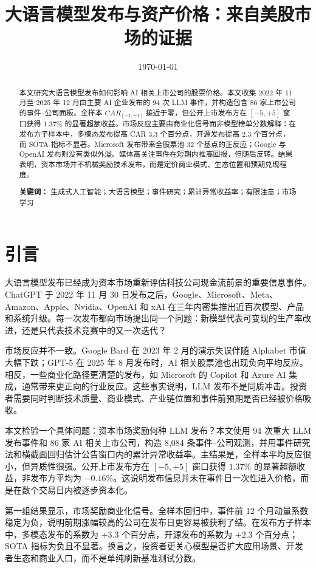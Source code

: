 \documentclass[11pt,fontset=fandol]{ctexart}
\title{\textbf{大语言模型发布与资产价格：来自美股市场的证据}}
\author{}
\date{\today}
\begin{document}
\maketitle

\begin{abstract}
\noindent 本文研究大语言模型发布如何影响 AI 相关上市公司的股票价格。本文收集 2022 年 11 月至 2025 年 12 月由主要 AI 企业发布的 94 次 LLM 事件，并构造包含 86 家上市公司的事件--公司面板。全样本 $CAR_{[-1,+1]}$ 接近于零，但公开上市发布方在 $[-5,+5]$ 窗口获得 $1.37\%$ 的显著超额收益。市场反应主要由商业化信号而非模型榜单分数解释：在发布方子样本中，多模态发布提高 CAR $3.3$ 个百分点，开源发布提高 $2.3$ 个百分点，而 SOTA 指标不显著。Microsoft 发布带来全股票池 $32$ 个基点的正反应；Google 与 OpenAI 发布则没有类似外溢。媒体高关注事件在短期内推高回报，但随后反转。结果表明，资本市场并不机械奖励技术发布，而是定价商业模式、生态位置和预期兑现程度。

\smallskip
\noindent\textbf{关键词：} 生成式人工智能；大语言模型；事件研究；累计异常收益率；有限注意；市场学习
\end{abstract}

\section{引言}

大语言模型发布已经成为资本市场重新评估科技公司现金流前景的重要信息事件。ChatGPT 于 2022 年 11 月 30 日发布之后，Google、Microsoft、Meta、Amazon、Apple、Nvidia、OpenAI 和 xAI 在三年内密集推出近百次模型、产品和系统升级。每一次发布都向市场提出同一个问题：新模型代表可变现的生产率改进，还是只代表技术竞赛中的又一次迭代？

市场反应并不一致。Google Bard 在 2023 年 2 月的演示失误伴随 Alphabet 市值大幅下跌；GPT-5 在 2025 年 8 月发布时，AI 相关股票池也出现负向平均反应。相反，一些商业化路径更清楚的发布，如 Microsoft 的 Copilot 和 Azure AI 集成，通常带来更正向的行业反应。这些事实说明，LLM 发布不是同质冲击。投资者需要同时判断技术质量、商业模式、产业链位置和事件前预期是否已经被价格吸收。

本文检验一个具体问题：资本市场奖励何种 LLM 发布？本文使用 94 次重大 LLM 发布事件和 86 家 AI 相关上市公司，构造 8{,}084 条事件--公司观测，并用事件研究法和横截面回归估计公告窗口内的累计异常收益率。主结果是，全样本平均反应很小，但异质性很强。公开上市发布方在 $[-5,+5]$ 窗口获得 $1.37\%$ 的显著超额收益，非发布方平均为 $-0.16\%$。这说明发布信息并未在事件日一次性进入价格，而是在数个交易日内被逐步资本化。

第一组结果显示，市场奖励商业化信号。全样本回归中，事件前 12 个月动量系数稳定为负，说明前期涨幅较高的公司在发布日更容易被获利了结。在发布方子样本中，多模态发布的系数为 $+3.3$ 个百分点，开源发布的系数为 $+2.3$ 个百分点；SOTA 指标为负且不显著。换言之，投资者更关心模型是否扩大应用场景、开发者生态和商业入口，而不是单纯刷新基准测试分数。
\end{document}
